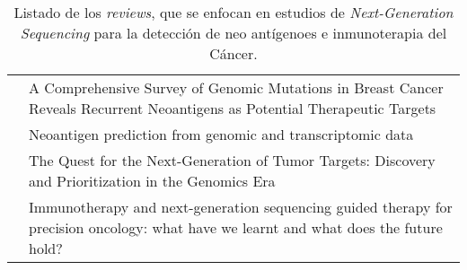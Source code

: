 \begin{table}[H]
		\caption{Listado de los \textit{reviews}, que se enfocan en estudios de \textit{Next-Generation Sequencing} para la detección de neo antígenoes e inmunoterapia del Cáncer.}
	\label{tab:review_seq}
	\begin{tabular}{p{3cm}p{10cm}}
		\cite{zhou2022comprehensive}     & A Comprehensive Survey of Genomic Mutations in Breast Cancer Reveals Recurrent Neoantigens as Potential Therapeutic Targets            \\
		\cite{battaglia2020neoantigen}   & Neoantigen prediction from genomic and transcriptomic data                                                                             \\
		\cite{mirandola2020quest}        & The Quest for the Next-Generation of Tumor Targets: Discovery and Prioritization in the Genomics Era                                   \\		
		\cite{groisberg2018immunotherapy}& Immunotherapy and next-generation sequencing guided therapy for precision oncology: what have we learnt and what does the future hold?
	\end{tabular}
\end{table}



